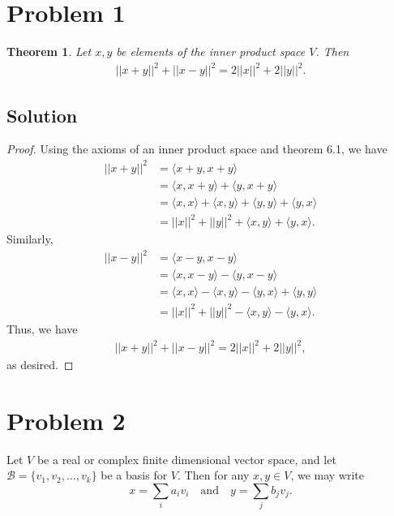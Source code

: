 \documentclass[10pt,a4paper]{article}
\author{Jeremiah Givens}
\newtheorem{theorem}{Theorem}
\theoremstyle{definition}
\newcommand{\B}{\mathcal{B}}
\begin{document}
\section*{Problem 1}
\begin{theorem}
Let $x,y$ be elements of the inner product space $V$. Then
\begin{align*}
||x + y ||^2 + ||x - y ||^2 = 2||x||^2 + 2||y||^2.
\end{align*}
\end{theorem}

\subsection*{Solution}
\begin{proof}
Using the axioms of an inner product space and theorem 6.1, we have
\begin{align*}
||x + y ||^2 &= \langle x + y , x + y \rangle \\
&= \langle x , x + y \rangle + \langle y , x + y \rangle\\
&= \langle x , x \rangle + \langle x , y \rangle + \langle y , y \rangle + \langle y , x \rangle\\
&= ||x||^2 + ||y||^2 + \langle x , y \rangle + \langle y , x \rangle.
\end{align*}
Similarly,
\begin{align*}
||x - y ||^2 &= \langle x - y , x - y \rangle \\
&= \langle x , x - y \rangle - \langle y , x - y \rangle\\
&= \langle x , x \rangle - \langle x , y \rangle - \langle y , x \rangle + \langle y , y \rangle\\
&= ||x||^2 + ||y||^2 - \langle x , y \rangle - \langle y , x \rangle.
\end{align*}
Thus, we have
\begin{align*}
||x + y ||^2 + ||x - y ||^2 = 2||x||^2 + 2||y||^2,
\end{align*}
as desired.
\end{proof}

\section*{Problem 2}
Let $V$ be a real or complex finite dimensional vector space, and let $\B = \{v_1, v_2, \ldots, v_k\}$ be a basis for $V$. Then for any $x, y \in V$, we may write
\[x = \sum_i a_i v_i \quad \text{and} \quad y = \sum_j b_j v_j.\]
\end{document}
